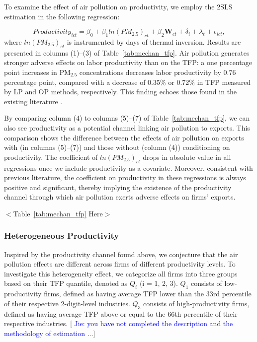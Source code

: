 \documentclass[12pt]{article}
\begin{document}
To examine the effect of air pollution on productivity, we
employ the 2SLS estimation in the following regression:

\begin{equation*}
Productivity_{ict}=\beta _{0}+\beta _{1}ln(PM_{2.5})_{ct}+\beta _{2}\mathbf{W}%
_{ct}+\delta _{i}+\lambda _{t}+\epsilon _{ict},
\end{equation*}%
where $ln(PM_{2.5})_{ct}$ is instrumented by days of thermal inversion. Results
are presented in columns (1)--(3) of Table~\ref{tab:mechan_tfp}. Air
pollution generates stronger adverse effects on labor productivity than on
the TFP: a one percentage point increases in $\mathrm{PM_{2.5}}$
concentrations decreases labor productivity by 0.76 percentage point,
compared with a decrease of 0.35\% or 0.72\% in TFP measured by LP and OP
methods, respectively. This finding echoes those found in the existing
literature %
\citep{fu2021air,somanathan2021impact,chang2016particulate,adhvaryu2022management}%
.

By comparing column (4) to columns (5)--(7) of Table~\ref{tab:mechan_tfp},
we can also see productivity as a potential channel linking air pollution to
exports. This comparison shows the difference between the effects of air
pollution on exports with (in columns (5)--(7)) and those without (column
(4)) conditioning on productivity. The coefficient of $ln(PM_{2.5})_{ct}$ drops
in absolute value in all regressions once we include productivity as a
covariate. Moreover, consistent with previous literature, the coefficient on productivity in these regressions is always positive and significant, thereby implying the existence of the productivity channel
through which air pollution exerts adverse effects on firms' exports. 

\begin{center}
$<$Table~\ref{tab:mechan_tfp} Here$>$
\end{center}

\subsubsection{Heterogeneous Productivity}

Inspired by the productivity channel found above, we conjecture that the air pollution effects are different across firms of different
productivity levels. To investigate this heterogeneity effect, we categorize all firms into three groups based on their TFP quantile, denoted as $Q_{i}$ (i = 1, 2, 3). $Q_{1}$ consists of low-productivity firms, defined as having average TFP lower than the 33rd percentile of their respective 2-digit-level industries.  $Q_{3}$ consists of high-productivity firms, defined as having average TFP above or equal to the 66th percentile of their respective industries. [\textcolor{blue}{ Jie: you have not completed the description and the methodology of estimation ...}] 
\end{document}
